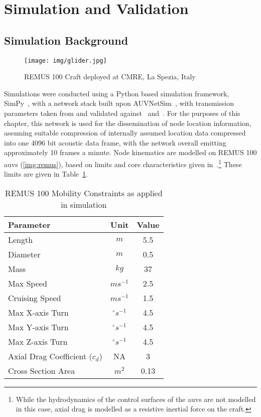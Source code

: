\section{Simulation and Validation}\label{sec:sim_and_valid}

\subsection{Simulation Background}

\begin{figure}
	\centering
	\texttt{[image: img/glider.jpg]}
	\caption{REMUS 100 Craft deployed at CMRE, La Spezia, Italy}
	\label{img:remus}
\end{figure}

Simulations were conducted using a Python based simulation framework, SimPy~\cite{Mueller2003SimPy}, with a network stack built upon AUVNetSim~\cite{Miquel2008}, with transmission parameters taken from and validated against~\cite{Stojanovic2007} and~\cite{Stefanov2011}.
For the purposes of this chapter, this network is used for the dissemination of node location information, assuming suitable compression of internally assumed location data compressed into one 4096 bit acoustic data frame, with the network overall emitting approximately 10 frames a minute.
Node kinematics are modelled on REMUS 100 \glspl{auv} (\autoref{img:remus}), based on limits and core characteristics given in~\cite{Mcewen2001,Milgram2001,Samad2011}.\footnote{While the hydrodynamics of the control surfaces of the \glspl{auv} are not modelled in this case, axial drag is modelled as a resistive inertial force on the craft.}
These limits are given in Table~\ref{tab:mobility_sysconstraints}.


\begin{table}
  \caption{REMUS 100 Mobility Constraints as applied in simulation} \label{tab:mobility_sysconstraints}
  \begin{center}
    \setlength{\tabcolsep}{8pt}
    \begin{tabular}{lcc}
      \toprule
      Parameter & Unit & Value \\
      \midrule
      Length & $m$ & 5.5\\
      Diameter & $m$ & 0.5\\
      Mass & $kg$ & 37 \\ 
      Max Speed & $ms^{-1}$ & 2.5\\
      Cruising Speed & $ms^{-1}$ & 1.5\\
      Max X-axis Turn & $^{\circ} s^{-1}$ & 4.5\\
      Max Y-axis Turn & $^{\circ} s^{-1}$ & 4.5\\
      Max Z-axis Turn & $^{\circ} s^{-1}$ & 4.5\\
      Axial Drag Coefficient ($c_d$) & NA & 3\\
      Cross Section Area & $m^2$ & 0.13\\
      \bottomrule
    \end{tabular}
    \setlength{\tabcolsep}{6pt}
  \end{center}
\end{table}

